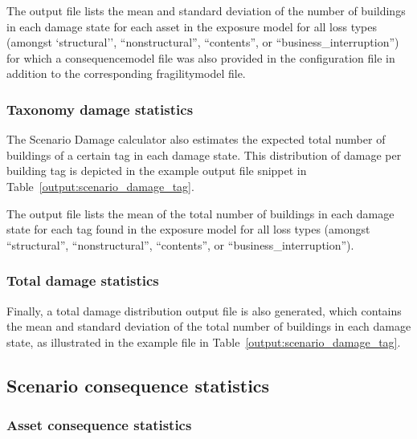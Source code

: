

The output file lists the mean and standard deviation of the number
of buildings in each damage state for each asset in the exposure model
for all loss types (amongst `structural'', ``nonstructural'', ``contents'', or
``business\_interruption'') for which a \gls{consequencemodel} file was also
provided in the configuration file in addition to the corresponding
\gls{fragilitymodel} file.


\subsubsection{Taxonomy damage statistics}
\label{subsubsec:scenario_taxonomy_damage_statistics}

The Scenario Damage calculator also estimates the expected total number of
buildings of a certain \gls{tag} in each damage state. This distribution
of damage per building \gls{tag} is depicted in the example
output file snippet in Table~\ref{output:scenario_damage_tag}.



The output file lists the mean of the total number
of buildings in each damage state for each tag found in the
exposure model for all loss types (amongst
``structural'', ``nonstructural'', ``contents'', or
``business\_interruption'').


\subsubsection{Total damage statistics}
\label{subsubsec:scenario_total_damage_statistics}

Finally, a total damage distribution output file is also generated, which
contains the mean and standard deviation of the total number of buildings in
each damage state, as illustrated in the example file in 
Table~\ref{output:scenario_damage_tag}.




\subsection{Scenario consequence statistics}
\label{subsec:scenario_consequence_statistics}

\subsubsection{Asset consequence statistics}
\label{subsubsec:scenario_asset_consequence_statistics}

